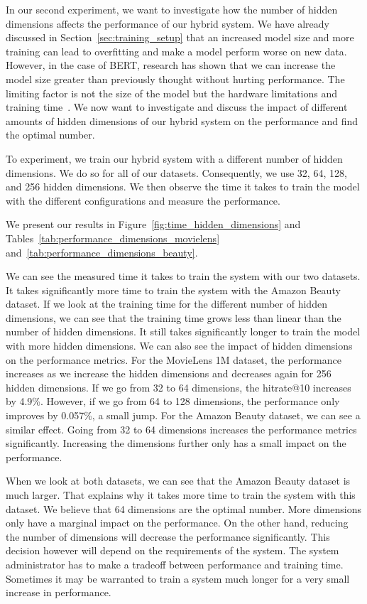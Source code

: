 In our second experiment, we want to investigate how the number of hidden dimensions affects the performance of our hybrid system. We have already discussed in Section~\ref{sec:training_setup} that an increased model size and more training can lead to overfitting and make a model perform worse on new data. However, in the case of BERT, research has shown that we can increase the model size greater than previously thought without hurting performance. The limiting factor is not the size of the model but the hardware limitations and training time~\cite{lan2019albert}. We now want to investigate and discuss the impact of different amounts of hidden dimensions of our hybrid system on the performance and find the optimal number.

To experiment, we train our hybrid system with a different number of hidden dimensions. We do so for all of our datasets. Consequently, we use 32, 64, 128, and 256 hidden dimensions. We then observe the time it takes to train the model with the different configurations and measure the performance. 

We present our results in Figure~\ref{fig:time_hidden_dimensions} and Tables~\ref{tab:performance_dimensions_movielens} and~\ref{tab:performance_dimensions_beauty}.

We can see the measured time it takes to train the system with our two datasets. It takes significantly more time to train the system with the Amazon Beauty dataset. If we look at the training time for the different number of hidden dimensions, we can see that the training time grows less than linear than the number of hidden dimensions. It still takes significantly longer to train the model with more hidden dimensions. We can also see the impact of hidden dimensions on the performance metrics. For the MovieLens 1M dataset, the performance increases as we increase the hidden dimensions and decreases again for 256 hidden dimensions. If we go from 32 to 64 dimensions, the hitrate@10 increases by 4.9\%. However, if we go from 64 to 128 dimensions, the performance only improves by 0.057\%, a small jump. For the Amazon Beauty dataset, we can see a similar effect. Going from 32 to 64 dimensions increases the performance metrics significantly. Increasing the dimensions further only has a small impact on the performance.

When we look at both datasets, we can see that the Amazon Beauty dataset is much larger. That explains why it takes more time to train the system with this dataset. We believe that 64 dimensions are the optimal number. More dimensions only have a marginal impact on the performance. On the other hand, reducing the number of dimensions will decrease the performance significantly. This decision however will depend on the requirements of the system. The system administrator has to make a tradeoff between performance and training time. Sometimes it may be warranted to train a system much longer for a very small increase in performance. 